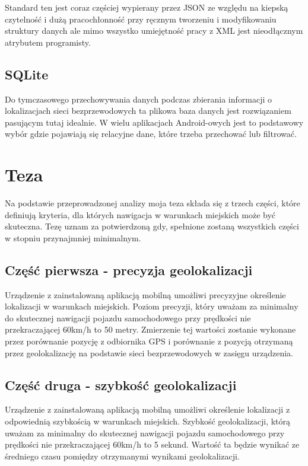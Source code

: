 Standard ten jest coraz częściej wypierany przez JSON ze względu na kiepską czytelność i dużą pracochłonność przy ręcznym tworzeniu i modyfikowaniu struktury danych ale mimo wszystko umiejętność pracy z XML jest nieodłącznym atrybutem programisty.

\subsection{SQLite}
Do tymczasowego przechowywania danych podczas zbierania informacji o lokalizacjach sieci bezprzewodowych ta plikowa baza danych jest rozwiązaniem pasującym tutaj idealnie. W wielu aplikacjach Android-owych jest to podstawowy wybór gdzie pojawiają się relacyjne dane, które trzeba przechować lub filtrować.

\section{Teza}
Na podstawie przeprowadzonej analizy moja teza składa się z trzech części, które definiują kryteria, dla których nawigacja w warunkach miejskich może być skuteczna. Tezę uznam za potwierdzoną gdy, spełnione zostaną wszystkich części w stopniu przynajmniej minimalnym.

\subsection{Część pierwsza - precyzja geolokalizacji}
Urządzenie z zainstalowaną aplikacją mobilną umożliwi precyzyjne określenie lokalizacji w warunkach miejskich. Poziom precyzji, który uważam za minimalny do skutecznej nawigacji pojazdu samochodowego przy prędkości nie przekraczającej 60km/h to 50 metry. Zmierzenie tej wartości zostanie wykonane przez porównanie pozycję z odbiornika GPS i porównanie z pozycją otrzymaną przez geolokalizację na podstawie sieci bezprzewodowych w zasięgu urządzenia.

\subsection{Część druga - szybkość geolokalizacji}
Urządzenie z zainstalowaną aplikacją mobilną umożliwi określenie lokalizacji z odpowiednią szybkością w warunkach miejskich. Szybkość geolokalizacji, którą uważam za minimalny do skutecznej nawigacji pojazdu samochodowego przy prędkości nie przekraczającej 60km/h to 5 sekund. Wartość ta będzie wynikać ze średniego czasu pomiędzy otrzymanymi wynikami geolokalizacji.

